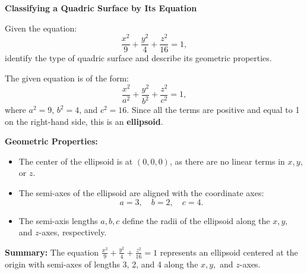 \begin{example}
\textbf{Classifying a Quadric Surface by Its Equation}

\noindent Given the equation:
\[
\frac{x^2}{9} + \frac{y^2}{4} + \frac{z^2}{16} = 1,
\]
identify the type of quadric surface and describe its geometric properties.

\begin{solution}

\noindent The given equation is of the form:
\[
\frac{x^2}{a^2} + \frac{y^2}{b^2} + \frac{z^2}{c^2} = 1,
\]
where \( a^2 = 9 \), \( b^2 = 4 \), and \( c^2 = 16 \). Since all the terms are positive and equal to 1 on the right-hand side, this is an \textbf{ellipsoid}.

\noindent \textbf{Geometric Properties:}
\begin{itemize}
    \item The center of the ellipsoid is at \( (0, 0, 0) \), as there are no linear terms in \( x, y, \) or \( z \).
    \item The semi-axes of the ellipsoid are aligned with the coordinate axes:
    \[
    a = 3, \quad b = 2, \quad c = 4.
    \]
    \item The semi-axis lengths \( a, b, c \) define the radii of the ellipsoid along the \( x, y, \) and \( z \)-axes, respectively.
\end{itemize}

\noindent \textbf{Summary:} The equation \( \frac{x^2}{9} + \frac{y^2}{4} + \frac{z^2}{16} = 1 \) represents an ellipsoid centered at the origin with semi-axes of lengths 3, 2, and 4 along the \( x, y, \) and \( z \)-axes.

\end{solution}
\end{example}






\exampleline

